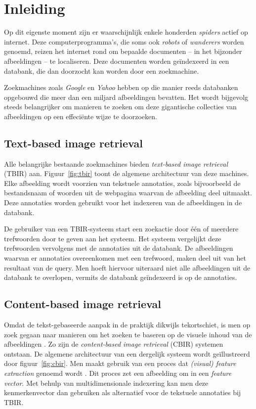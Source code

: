 \chapter{Inleiding}

Op dit eigenste moment zijn er waarschijnlijk enkele honderden \emph{spiders} actief op internet.
Deze computerprogramma's, die soms ook \emph{robots} of \emph{wanderers} worden genoemd, reizen
het internet rond om bepaalde documenten -- in het bijzonder afbeeldingen -- te localiseren. Deze 
documenten worden ge\"indexeerd in een databank, die dan doorzocht kan worden door een zoekmachine. 

Zoekmachines zoals \emph{Google} en \emph{Yahoo} hebben op die manier reeds databanken
opgebouwd die meer dan een miljard afbeeldingen bevatten. Het wordt bijgevolg steeds belangrijker
om manieren te zoeken om deze gigantische collecties van afbeeldingen op een effeci\"ente wijze
te doorzoeken.


\section{Text-based image retrieval}

Alle belangrijke bestaande zoekmachines bieden \emph{text-based image retrieval} (TBIR) aan. 
Figuur~\ref{fig:tbir} toont de algemene architectuur van deze machines. Elke afbeelding 
wordt voorzien van tekstuele annotaties, zoals bijvoorbeeld de 
bestandsnaam of woorden uit de webpagina waarvan de afbeelding deel uitmaakt. Deze annotaties
worden gebruikt voor het indexeren van de afbeeldingen in de databank.

De gebruiker van een TBIR-systeem start een zoekactie door \'e\'en of meerdere trefwoorden door te geven
aan het systeem. Het systeem vergelijkt deze trefwoorden vervolgens met de annotaties uit
de databank. De afbeeldingen waarvan er annotaties overeenkomen met een trefwoord, maken
deel uit van het resultaat van de query. Men hoeft hiervoor uiteraard niet alle afbeeldingen
uit de databank te overlopen, vermits de databank ge\"indexeerd is op de annotaties. 

\section{Content-based image retrieval}

Omdat de tekst-gebaseerde aanpak in de praktijk dikwijls tekortschiet, is men op zoek gegaan 
naar manieren om het zoeken te baseren op de visuele inhoud van de afbeeldingen 
\cite{smeulders:cbir_end_of_early_years}. Zo zijn de \emph{content-based image retrieval} (CBIR) systemen 
\cite{veltcamp:cbirs} ontstaan. 
De algemene architectuur van een dergelijk systeem wordt ge\"illustreerd door
figuur~\ref{fig:cbir}. Men maakt gebruik van een proces dat 
\emph{(visual) feature extraction} genoemd wordt \cite{rui:image_retr}. Dit proces zet een afbeelding om in een 
\emph{feature vector}. Met behulp van multidimensionale indexering kan men deze kenmerkenvector
dan gebruiken als alternatief voor de tekstuele annotaties bij TBIR.

